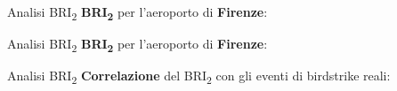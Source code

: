 \documentclass[10pt]{beamer}
\begin{document}
\begin{frame}{Analisi BRI\textsubscript{2}}
\textbf{BRI\textsubscript{2}} per l'aeroporto di \textbf{Firenze}:
\begin{figure}
	\centering
\end{figure}
\end{frame}

\begin{frame}{Analisi BRI\textsubscript{2}}
\textbf{BRI\textsubscript{2}} per l'aeroporto di \textbf{Firenze}:
\begin{figure}
	\centering
\end{figure}
\end{frame}


\begin{frame}{Analisi BRI\textsubscript{2}}
\textbf{Correlazione} del BRI\textsubscript{2} con gli eventi di birdstrike reali:
\begin{table}
	\centering
\end{table}
\end{frame}
\end{document}
